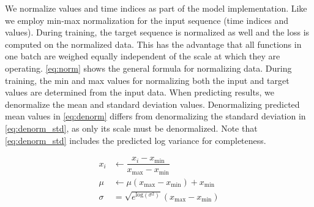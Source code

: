 We normalize values and time indices as part of the model implementation. Like \citet{seifner2025zeroshotimputationfoundationinference} we employ min-max normalization for the input sequence (time indices and values). During training, the target sequence is normalized as well and the loss is computed on the normalized data. This has the advantage that all functions in one batch are weighed equally independent of the scale at which they are operating. \autoref{eq:norm} shows the general formula for normalizing data. During training, the min and max values for normalizing both the input and target values are determined from the input data. When predicting results, we denormalize the mean and standard deviation values. Denormalizing predicted mean values in \autoref{eq:denorm} differs from denormalizing the standard deviation in \autoref{eq:denorm_std}, as only its scale must be denormalized. Note that \autoref{eq:denorm_std} includes the predicted log variance for completeness.

\begin{align}
x_i &\leftarrow \dfrac{x_i-x_{\text{min}}}{x_{\text{max}}-x_{\text{min}}} \label{eq:norm} \\
\mu &\leftarrow \mu (x_{\text{max}}-x_{\text{min}}) + x_{\text{min}} \label{eq:denorm} \\
\sigma &= \sqrt{e^{\text{log}(\sigma^2)}} (x_{\text{max}}-x_{\text{min}}) \label{eq:denorm_std} 
\end{align}



